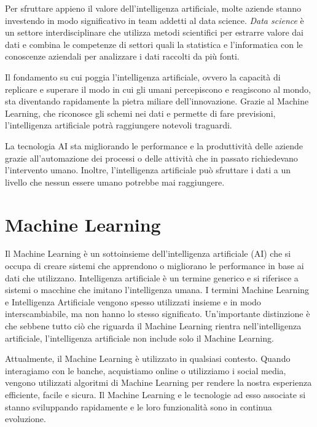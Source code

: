 Per sfruttare appieno il valore dell'intelligenza artificiale, molte aziende stanno investendo in modo significativo in team addetti al data science. \emph{Data science} è un settore interdisciplinare che utilizza metodi scientifici per estrarre valore dai dati e combina le competenze di settori quali la statistica e l'informatica con le conoscenze aziendali per analizzare i dati raccolti da più fonti.

Il fondamento su cui poggia l'intelligenza artificiale, ovvero la capacità di replicare e superare il modo in cui gli umani percepiscono e reagiscono al mondo, sta diventando rapidamente la pietra miliare dell'innovazione. Grazie al Machine Learning, che riconosce gli schemi nei dati e permette di fare previsioni, l'intelligenza artificiale potrà raggiungere notevoli traguardi.

La tecnologia AI sta migliorando le performance e la produttività delle aziende grazie all'automazione dei processi o delle attività che in passato richiedevano l'intervento umano. Inoltre, l'intelligenza artificiale può sfruttare i dati a un livello che nessun essere umano potrebbe mai raggiungere.
\cite{introAI}

\newpage
\section{Machine Learning}
\vspace{8mm}

Il Machine Learning è un sottoinsieme dell'intelligenza artificiale (AI) che si occupa di creare sistemi che apprendono o migliorano le performance in base ai dati che utilizzano. Intelligenza artificiale è un termine generico e si riferisce a sistemi o macchine che imitano l'intelligenza umana. I termini Machine Learning e Intelligenza Artificiale vengono spesso utilizzati insieme e in modo interscambiabile, ma non hanno lo stesso significato. Un'importante distinzione è che sebbene tutto ciò che riguarda il Machine Learning rientra nell'intelligenza artificiale, l'intelligenza artificiale non include solo il Machine Learning.

Attualmente, il Machine Learning è utilizzato in qualsiasi contesto. Quando interagiamo con le banche, acquistiamo online o utilizziamo i social media, vengono utilizzati algoritmi di Machine Learning per rendere la nostra esperienza efficiente, facile e sicura. Il Machine Learning e le tecnologie ad esso associate si stanno sviluppando rapidamente e le loro funzionalità sono in continua evoluzione.

